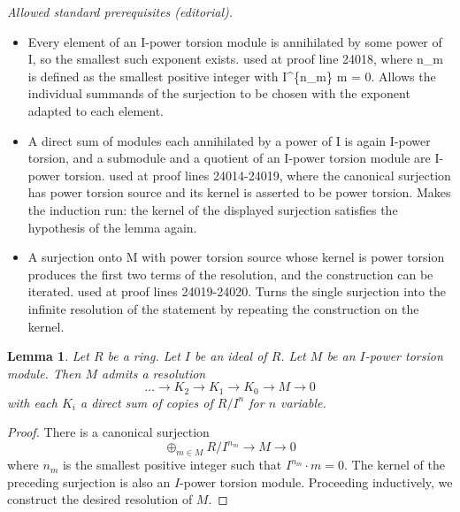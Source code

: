 \documentclass[10pt,a4paper]{amsart}
\theoremstyle{plain}
\newtheorem{lemma}[subsection]{Lemma}
\theoremstyle{definition}
\theoremstyle{remark}
\numberwithin{equation}{subsection}
\begin{document}
\noindent\textit{Allowed standard prerequisites (editorial).}\begin{itemize}
\item Every element of an I-power torsion module is annihilated by some power of I, so the smallest such exponent exists. used at proof line 24018, where n\_m is defined as the smallest positive integer with I\textasciicircum{}\{n\_m\} m = 0. Allows the individual summands of the surjection to be chosen with the exponent adapted to each element.
\item A direct sum of modules each annihilated by a power of I is again I-power torsion, and a submodule and a quotient of an I-power torsion module are I-power torsion. used at proof lines 24014-24019, where the canonical surjection has power torsion source and its kernel is asserted to be power torsion. Makes the induction run: the kernel of the displayed surjection satisfies the hypothesis of the lemma again.
\item A surjection onto M with power torsion source whose kernel is power torsion produces the first two terms of the resolution, and the construction can be iterated. used at proof lines 24019-24020. Turns the single surjection into the infinite resolution of the statement by repeating the construction on the kernel.
\end{itemize}\medskip
\begin{lemma}
\label{lemma-I-power-torsion-presentation}
Let $R$ be a ring.
Let $I$ be an ideal of $R$.
Let $M$ be an $I$-power torsion module.
Then $M$ admits a resolution
$$
\ldots \to K_2 \to K_1 \to K_0 \to M \to 0
$$
with each $K_i$ a direct sum of copies of $R/I^n$ for $n$ variable.
\end{lemma}

\begin{proof}
There is a canonical surjection
$$
\oplus_{m \in M} R/I^{n_m} \to M \to 0
$$
where $n_m$ is the smallest positive integer such that $I^{n_m} \cdot m = 0$.
The kernel of the preceding surjection is also an $I$-power torsion module.
Proceeding inductively, we construct the desired resolution of $M$.
\end{proof}
\end{document}

